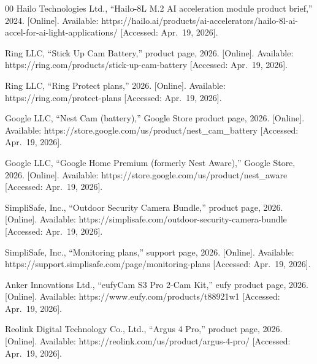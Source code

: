 \documentclass{ieeeaccess}
\begin{document}
\begin{thebibliography}{00}
 Hailo Technologies Ltd., ``Hailo-8L M.2 AI acceleration module product brief,'' 2024. [Online]. Available: https://hailo.ai/products/ai-accelerators/hailo-8l-ai-accel-for-ai-light-applications/ [Accessed: Apr.~19, 2026].

 Ring LLC, ``Stick Up Cam Battery,'' product page, 2026. [Online]. Available: https://ring.com/products/stick-up-cam-battery [Accessed: Apr.~19, 2026].

 Ring LLC, ``Ring Protect plans,'' 2026. [Online]. Available: https://ring.com/protect-plans [Accessed: Apr.~19, 2026].

 Google LLC, ``Nest Cam (battery),'' Google Store product page, 2026. [Online]. Available: https://store.google.com/us/product/nest\_cam\_battery [Accessed: Apr.~19, 2026].

 Google LLC, ``Google Home Premium (formerly Nest Aware),'' Google Store, 2026. [Online]. Available: https://store.google.com/us/product/nest\_aware [Accessed: Apr.~19, 2026].

 SimpliSafe, Inc., ``Outdoor Security Camera Bundle,'' product page, 2026. [Online]. Available: https://simplisafe.com/outdoor-security-camera-bundle [Accessed: Apr.~19, 2026].

 SimpliSafe, Inc., ``Monitoring plans,'' support page, 2026. [Online]. Available: https://support.simplisafe.com/page/monitoring-plans [Accessed: Apr.~19, 2026].

 Anker Innovations Ltd., ``eufyCam S3 Pro 2-Cam Kit,'' eufy product page, 2026. [Online]. Available: https://www.eufy.com/products/t88921w1 [Accessed: Apr.~19, 2026].

 Reolink Digital Technology Co., Ltd., ``Argus 4 Pro,'' product page, 2026. [Online]. Available: https://reolink.com/us/product/argus-4-pro/ [Accessed: Apr.~19, 2026].

\end{thebibliography}

\raggedbottom
\makeatletter
{}
\patchcmd{\IEEEbiography}{\@IEEEtranneedspace{\@IEEEtrantmpdimenA}{\relax}}{}{}{}
\makeatother
\end{document}
